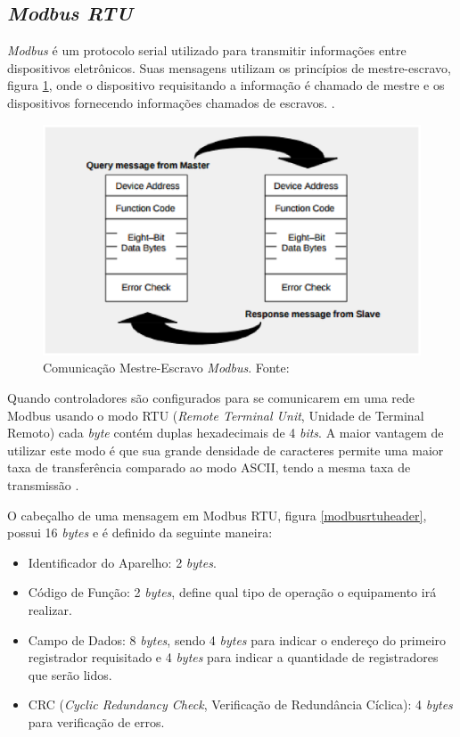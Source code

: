     \subsection{\textit{Modbus RTU}}
    \textit{Modbus} é um protocolo serial utilizado para transmitir informações entre dispositivos eletrônicos. Suas mensagens utilizam os princípios de mestre-escravo, figura \ref{mestre_escravo}, onde o dispositivo requisitando a informação é chamado de mestre e os dispositivos fornecendo informações chamados de escravos. \cite{modbus}.
    \begin{figure}[!htpb]
        \centering
        \includegraphics[keepaspectratio=true,scale=0.8]{figuras/mestre_escravo.eps}
        \caption{Comunicação Mestre-Escravo \textit{Modbus}. Fonte: \cite{modbus}}
        \label{mestre_escravo}
    \end{figure}

    Quando controladores são configurados para se comunicarem em uma rede Modbus usando o modo RTU (\textit{Remote Terminal Unit}, Unidade de Terminal Remoto) cada \textit{byte} contém duplas hexadecimais de 4 \textit{bits}. A maior vantagem de utilizar este modo é que sua grande densidade de caracteres permite uma maior taxa de transferência comparado ao modo ASCII, tendo a mesma taxa de transmissão \cite{modbus}.

    O cabeçalho de uma mensagem em Modbus RTU, figura \ref{modbusrtuheader}, possui 16 \textit{bytes} e é definido da seguinte maneira:
    \begin{itemize}
        \item Identificador do Aparelho: 2 \textit{bytes}.
        \item Código de Função: 2 \textit{bytes}, define qual tipo de operação o equipamento irá realizar.
        \item Campo de Dados: 8 \textit{bytes}, sendo 4 \textit{bytes} para indicar o endereço do primeiro registrador requisitado e 4 \textit{bytes} para indicar a quantidade de registradores que serão lidos.
        \item CRC (\textit{Cyclic Redundancy Check}, Verificação de Redundância Cíclica): 4 \textit{bytes} para verificação de erros.
    \end{itemize}

